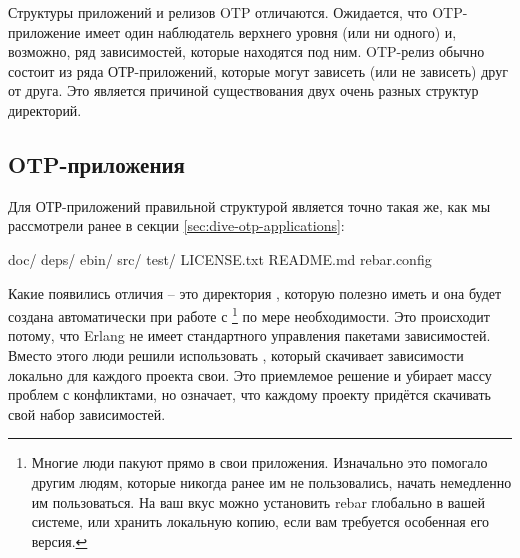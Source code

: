 \documentclass[11pt, oneside]{book}   	%
\begin{document}
Структуры приложений и релизов OTP отличаются. Ожидается, что OTP-приложение имеет один наблюдатель верхнего уровня (или ни одного) и, возможно, ряд зависимостей, которые находятся под ним. OTP-релиз обычно состоит из ряда ОТР-приложений, которые могут зависеть (или не зависеть) друг от друга. Это является причиной существования двух очень разных структур директорий.

\subsection{OTP-приложения}
\label{subsec:building-otp-applications}

Для ОТР-приложений правильной структурой является точно такая же, как мы рассмотрели ранее в секции \ref{sec:dive-otp-applications}:

\begin{VerbatimText}
doc/
deps/
ebin/
src/
test/
LICENSE.txt
README.md
rebar.config
\end{VerbatimText}

Какие появились отличия -- это директория , которую полезно иметь и она будет создана автоматически при работе с \footnote{Многие люди пакуют  прямо в свои приложения. Изначально это помогало другим людям, которые никогда ранее им не пользовались, начать немедленно им пользоваться. На ваш вкус можно установить rebar глобально в вашей системе, или хранить локальную копию, если вам требуется особенная его версия.} по мере необходимости. Это происходит потому, что Erlang не имеет стандартного управления пакетами зависимостей. Вместо этого люди решили использовать , который скачивает зависимости локально для каждого проекта свои. Это приемлемое решение и убирает массу проблем с конфликтами, но означает, что каждому проекту придётся скачивать свой набор зависимостей.
\end{document}
